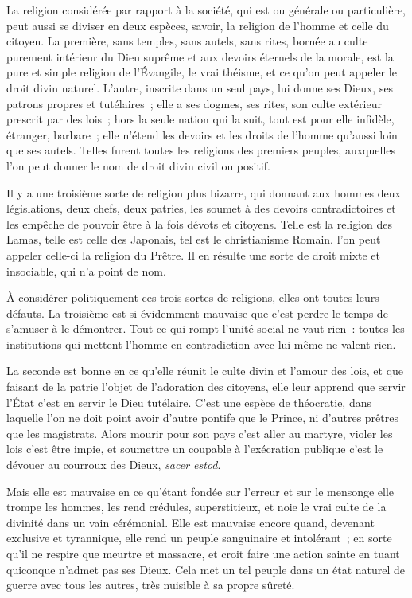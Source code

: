 \documentclass[french,twoside]{book} %
\begin{document}
La religion considérée par rapport à la société, qui est ou générale ou particulière, peut aussi se diviser en deux espèces, savoir, la religion de l’homme et celle du citoyen. La première, sans temples, sans autels, sans rites, bornée au culte purement intérieur du Dieu suprême et aux devoirs éternels de la morale, est la pure et simple religion de l’Évangile, le vrai théisme, et ce qu’on peut appeler le droit divin naturel. L’autre, inscrite dans un seul pays, lui donne ses Dieux, ses patrons propres et tutélaires ; elle a ses dogmes, ses rites, son culte extérieur prescrit par des lois ; hors la seule nation qui la suit, tout est pour elle infidèle, étranger, barbare ; elle n’étend les devoirs et les droits de l’homme qu’aussi loin que ses autels. Telles furent toutes les religions des premiers peuples, auxquelles l’on peut donner le nom de droit divin civil ou positif.\par
Il y a une troisième sorte de religion plus bizarre, qui donnant aux hommes deux législations, deux chefs, deux patries, les soumet à des devoirs contradictoires et les empêche de pouvoir être à la fois dévots et citoyens. Telle est la religion des Lamas, telle est celle des Japonais, tel est le christianisme Romain. l’on peut appeler celle-ci la religion du Prêtre. Il en résulte une sorte de droit mixte et insociable, qui n’a point de nom.\par
À considérer politiquement ces trois sortes de religions, elles ont toutes leurs défauts. La troisième est si évidemment mauvaise que c’est perdre le temps de s’amuser à le démontrer. Tout ce qui rompt l’unité social ne vaut rien : toutes les institutions qui mettent l’homme en contradiction avec lui-même ne valent rien.\par
La seconde est bonne en ce qu’elle réunit le culte divin et l’amour des lois, et que faisant de la patrie l’objet de l’adoration des citoyens, elle leur apprend que servir l’État c’est en servir le Dieu tutélaire. C’est une espèce de théocratie, dans laquelle l’on ne doit point avoir d’autre pontife que le Prince, ni d’autres prêtres que les magistrats. Alors mourir pour son pays c’est aller au martyre, violer les lois c’est être impie, et soumettre un coupable à l’exécration publique c’est le dévouer au courroux des Dieux, {\itshape sacer estod}.\par
Mais elle est mauvaise en ce qu’étant fondée sur l’erreur et sur le mensonge elle trompe les hommes, les rend crédules, superstitieux, et noie le vrai culte de la divinité dans un vain cérémonial. Elle est mauvaise encore quand, devenant exclusive et tyrannique, elle rend un peuple sanguinaire et intolérant ; en sorte qu’il ne respire que meurtre et massacre, et croit faire une action sainte en tuant quiconque n’admet pas ses Dieux. Cela met un tel peuple dans un état naturel de guerre avec tous les autres, très nuisible à sa propre sûreté.\par
\end{document}
